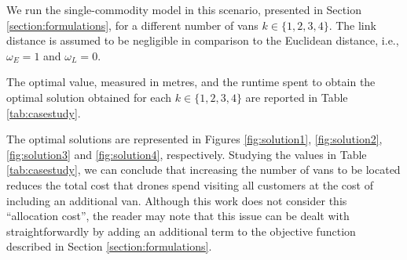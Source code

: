 \documentclass[a4paper,  review, authoryear, 1p.]{elsarticle}
\begin{document}
		We run the single-commodity model in this scenario,  presented in Section \ref{section:formulations}, for a different number of vans $k\in\{1, 2, 3, 4\}$. The link distance is assumed to be negligible in comparison to the Euclidean distance, i.e., $\omega_E=1$ and $\omega_L=0$. 
		
		The optimal value, measured in metres, and the runtime spent to obtain the optimal solution obtained for each $k\in\{1,2,3,4\}$ are reported in Table \ref{tab:casestudy}. 
		
		\begin{table}[H]
			\centering
			\caption{Optimal solution and runtime for each configuration}
		\end{table}
		
		The optimal solutions are represented in Figures \ref{fig:solution1}, \ref{fig:solution2}, \ref{fig:solution3} and \ref{fig:solution4}, respectively. Studying the values in Table \ref{tab:casestudy}, we can conclude that increasing the number of vans to be located reduces the total cost that drones spend visiting all customers at the cost of including an additional van. Although this work does not consider this ``allocation cost'', the reader may note that this issue can be dealt with straightforwardly by adding an additional term to the objective function described in Section \ref{section:formulations}.
		
\end{document}
